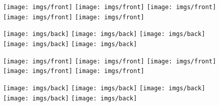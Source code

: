 \documentclass[a4paper,10pt,twocolumn]{jarticle}
\begin{document}
	
\begin{figure}[t!]
	\centering
	\texttt{[image: imgs/front]}
	\texttt{[image: imgs/front]}
	\texttt{[image: imgs/front]}
	\texttt{[image: imgs/front]}
	\texttt{[image: imgs/front]}
\end{figure}
\begin{figure}[t!]
        \centering
        \texttt{[image: imgs/back]}
        \texttt{[image: imgs/back]}
        \texttt{[image: imgs/back]}
        \texttt{[image: imgs/back]}
        \texttt{[image: imgs/back]}
\end{figure}
\begin{figure}[t!]
	\centering
	\texttt{[image: imgs/front]}
	\texttt{[image: imgs/front]}
	\texttt{[image: imgs/front]}
	\texttt{[image: imgs/front]}
	\texttt{[image: imgs/front]}
\end{figure}
\begin{figure}[t!]
	\centering
	\texttt{[image: imgs/back]}
	\texttt{[image: imgs/back]}
	\texttt{[image: imgs/back]}
	\texttt{[image: imgs/back]}
	\texttt{[image: imgs/back]}
\end{figure}
\end{document}
